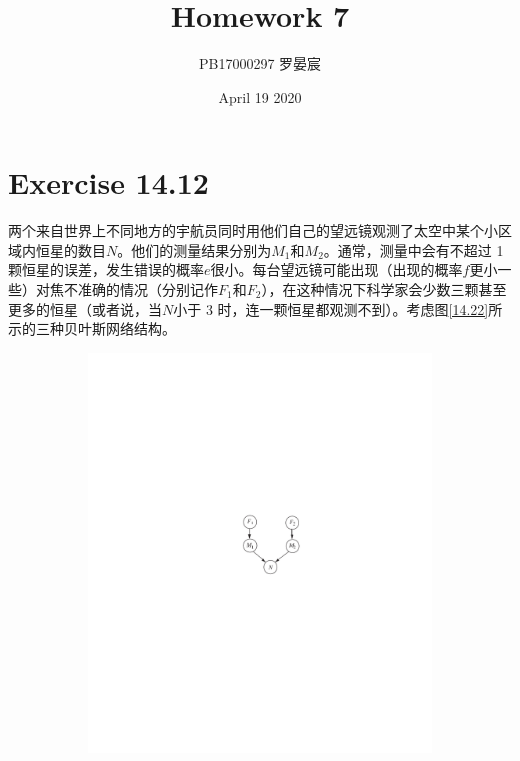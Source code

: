 \documentclass{article}
\title{Homework 7}
\author{PB17000297 罗晏宸}
\date{April 19 2020}
\begin{document}
\maketitle

\section{Exercise 14.12}
两个来自世界上不同地方的宇航员同时用他们自己的望远镜观测了太空中某个小区域内恒星的数目$N$。他们的测量结果分别为$M_1$和$M_2$。通常，测量中会有不超过 1 颗恒星的误差，发生错误的概率$e$很小。每台望远镜可能出现（出现的概率$f$更小一些）对焦不准确的情况（分别记作$F_1$和$F_2$），在这种情况下科学家会少数三颗甚至更多的恒星（或者说，当$N$小于 3 时，连一颗恒星都观测不到）。考虑图\ref{14.22}所示的三种贝叶斯网络结构。
\begin{figure}
    \centering
    \begin{subfigure}[t]{0.3\textwidth}
        \centering
        \includegraphics[scale = 0.7]{Figure/14-22(i).pdf}
        \caption{}
        \label{14.22(i)}
    \end{subfigure}
    \begin{subfigure}[t]{0.3\textwidth}

\end{subfigure}
\end{figure}
\end{document}
